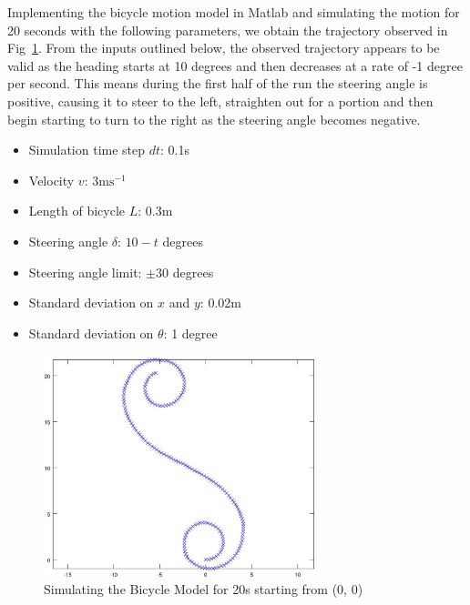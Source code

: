 \documentclass{article}
\begin{document}
Implementing the bicycle motion model in Matlab and simulating the motion for 20 seconds with the following parameters, we obtain the trajectory observed in Fig~\ref{fig:bicycle_20s}. From the inputs outlined below, the observed trajectory appears to be valid as the heading starts at 10 degrees and then decreases at a rate of -1 degree per second. This means during the first half of the run the steering angle is positive, causing it to steer to the left, straighten out for a portion and then begin starting to turn to the right as the steering angle becomes negative. 


\begin{itemize}	
	\vspace{-0.4cm}
	\setlength{\itemsep}{0pt}
	\setlength{\parskip}{0pt}
	\setlength{\parsep}{0pt}
	
	\item{Simulation time step $dt$: 0.1s}
	\item{Velocity $v$: $3 \text{ms}^{-1}$}
	\item{Length of bicycle $L$: 0.3m}
	\item{Steering angle $\delta$: $10 - t$ degrees}
	\item{Steering angle limit: $\pm 30$ degrees}
	\item{Standard deviation on $x$ and $y$: 0.02m}
	\item{Standard deviation on $\theta$: 1 degree}
\end{itemize}

\begin{figure}[H]
	\centering
	\includegraphics[width=0.7\textwidth]{images/bicycle_motion_20s.jpg}
	\caption{Simulating the Bicycle Model for 20s starting from (0, 0)}
	\label{fig:bicycle_20s}
\end{figure}
\end{document}
